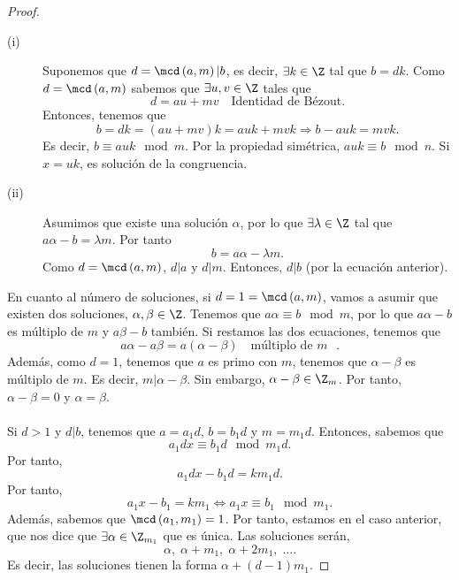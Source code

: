 \begin{proof}
\begin{description}
\item[(i)] Suponemos que $\displaystyle d = \mcd\left(a,m\right) | b $, es decir, $\displaystyle \exists k \in \Z $ tal que $\displaystyle b = dk $. Como $\displaystyle d = \mcd\left(a,m\right) $ sabemos que $\displaystyle \exists u,v \in \Z $ tales que 
	\[d = au + mv \quad \text{Identidad de Bézout} .\]
Entonces, tenemos que
\[b = dk = \left(au + mv\right)k = auk + mvk \Rightarrow b - a uk = mvk .\]
Es decir, $\displaystyle b \equiv auk \mod m $. Por la propiedad simétrica, $\displaystyle auk \equiv b \mod n $. Si $\displaystyle x = uk $, es solución de la congruencia.
\item[(ii)] Asumimos que existe una solución $\displaystyle \alpha  $, por lo que $\displaystyle \exists \lambda \in \Z $ tal que $\displaystyle a \alpha - b = \lambda m $. Por tanto
	\[b = a \alpha - \lambda m .\]
Como $\displaystyle d = \mcd\left(a,m\right) $, $\displaystyle d | a $ y $\displaystyle d | m $. Entonces, $\displaystyle d | b $ (por la ecuación anterior).
\end{description}
En cuanto al número de soluciones, si $\displaystyle d = 1 = \mcd\left(a,m\right) $, vamos a asumir que existen dos soluciones, $\displaystyle \alpha, \beta \in \Z $. Tenemos que $\displaystyle a \alpha \equiv  b \mod m $, por lo que $\displaystyle a \alpha - b $ es múltiplo de $\displaystyle m $ y $\displaystyle a \beta - b $ también. Si restamos las dos ecuaciones, tenemos que 
\[a \alpha - a \beta = a \left(\alpha - \beta \right) \quad \text{múltiplo de $\displaystyle m $ } .\]
Además, como $\displaystyle d = 1 $, tenemos que $\displaystyle a $ es primo con $\displaystyle m $, tenemos que $\displaystyle \alpha - \beta  $ es múltiplo de $\displaystyle m $. Es decir, $\displaystyle m | \alpha - \beta  $. Sin embargo, $\displaystyle \alpha - \beta \in \Z_{m} $. Por tanto, $\displaystyle \alpha - \beta = 0 $ y $\displaystyle \alpha = \beta  $. \\ \\
Si $\displaystyle d > 1 $ y $\displaystyle d | b $, tenemos que $\displaystyle a = a_{1}d $, $\displaystyle b = b_{1}d $ y $\displaystyle m = m_{1}d $. Entonces, sabemos que 
\[a_{1}dx \equiv b_{1}d \mod m_{1}d .\]
Por tanto, 
\[a_{1}dx - b_{1}d = km_{1}d .\]
Por tanto, 
\[a_{1}x - b_{1} = km_{1} \iff a_{1}x \equiv b_{1} \mod m_{1} .\]
Además, sabemos que $\displaystyle \mcd\left(a_{1},m_{1}\right) = 1 $. Por tanto, estamos en el caso anterior, que nos dice que $\displaystyle \exists \alpha \in \Z_{m_{1}} $ que es única. Las soluciones serán, 
\[\alpha, \; \alpha + m_{1}, \; \alpha + 2m_{1}, \; \ldots .\]
Es decir, las soluciones tienen la forma $\displaystyle \alpha + \left(d - 1\right)m_{1} $.
\end{proof}

